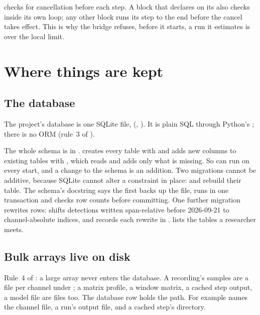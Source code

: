 \begin{watchout}
 checks for cancellation before each step. A block that declares
 on its  also checks inside its own loop; any other block runs its
step to the end before the cancel takes effect. This is why the bridge refuses, before it starts, a
run it estimates is over the local limit.
\end{watchout}

\section{Where things are kept}\label{sec:architecture-storage}
\subsection{The database}
The project's database is one SQLite file, 
(, ). It is plain SQL through Python's
; there is no ORM (rule~3 of ).

The whole schema is in .  creates every table with
 and adds new columns to existing tables with
, which reads  and adds only what is missing. So
 can run on every start, and a change to the schema is an addition. Two migrations
cannot be additive, because SQLite cannot alter a  constraint in place:
 and  rebuild their table. The
schema's docstring says the first backs up the file, runs in one transaction and checks row counts
before committing. One further migration rewrites rows:  shifts
detections written span-relative before 2026-09-21 to channel-absolute indices, and records each
rewrite in .  lists the tables a researcher meets.

\subsection{Bulk arrays live on disk}
Rule~4 of : a large array never enters the database. A recording's samples are a
 file per channel under ; a matrix profile, a window
matrix, a cached step output, a model file are files too. The database row holds the path. For
example  names the channel file,  a run's output
file, and  a cached step's directory.

